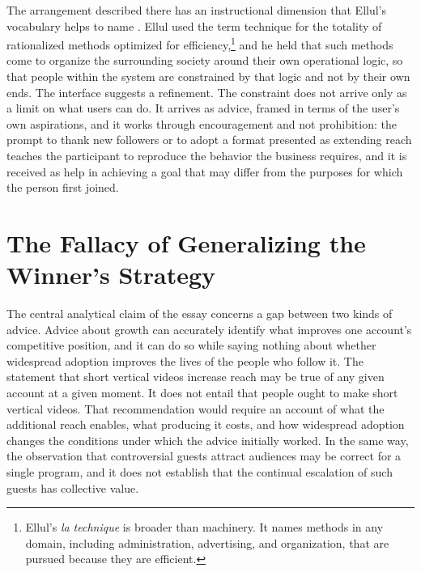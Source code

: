 \documentclass[12pt]{article}
\theoremstyle{plain}
\theoremstyle{definition}
\begin{document}
The arrangement described there has an instructional dimension that Ellul's vocabulary helps to name \cite{ellul1964}. Ellul used the term technique for the totality of rationalized methods optimized for efficiency,\footnote{Ellul's \emph{la technique} is broader than machinery. It names methods in any domain, including administration, advertising, and organization, that are pursued because they are efficient.} and he held that such methods come to organize the surrounding society around their own operational logic, so that people within the system are constrained by that logic and not by their own ends. The interface suggests a refinement. The constraint does not arrive only as a limit on what users can do. It arrives as advice, framed in terms of the user's own aspirations, and it works through encouragement and not prohibition: the prompt to thank new followers or to adopt a format presented as extending reach teaches the participant to reproduce the behavior the business requires, and it is received as help in achieving a goal that may differ from the purposes for which the person first joined.

\section{The Fallacy of Generalizing the Winner's Strategy}

The central analytical claim of the essay concerns a gap between two kinds of advice. Advice about growth can accurately identify what improves one account's competitive position, and it can do so while saying nothing about whether widespread adoption improves the lives of the people who follow it. The statement that short vertical videos increase reach may be true of any given account at a given moment. It does not entail that people ought to make short vertical videos. That recommendation would require an account of what the additional reach enables, what producing it costs, and how widespread adoption changes the conditions under which the advice initially worked. In the same way, the observation that controversial guests attract audiences may be correct for a single program, and it does not establish that the continual escalation of such guests has collective value.
\end{document}
